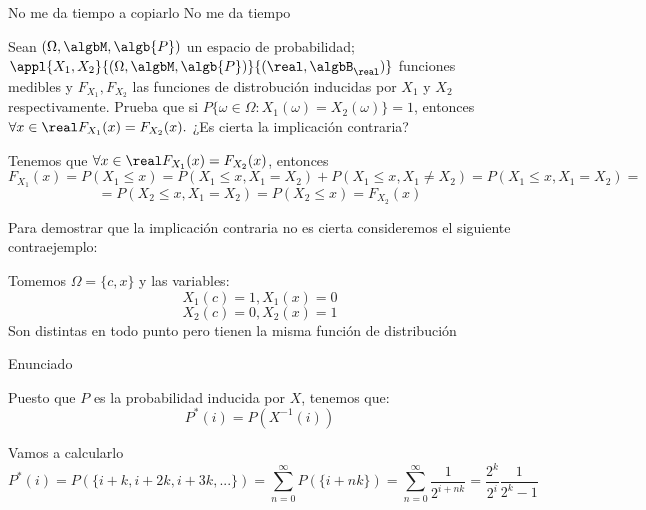 \begin{problem}[3]
No me da tiempo a copiarlo
\solution
No me da tiempo
\end{problem}

\begin{problem}[6]
Sean $(\Omega, \algbM, \algb{P})$ un espacio de probabilidad; $\appl{X_1, X_2}{(\Omega, \algbM, \algb{P})}{(\real, \algbB_{\real})}$ funciones medibles y $F_{X_1}, F_{X_2}$ las funciones de distrobución inducidas por $X_1$ y $X_2$ respectivamente. Prueba que si $P\{\omega \in \Omega : X_1(\omega)=X_2(\omega)\}=1$, entonces $\forall x \in \real F_{X_1}(x) = F_{X_2}(x).$ ¿Es cierta la implicación contraria?

\solution
Tenemos que $\forall x \in \real F_{X_1}(x) = F_{X_2}(x)$, entonces
\[F_{X_1}(x) = P(X_1 \leq x) = P(X_1 \leq x, X_1=X_2) + P(X_1 \leq x, X_1 \neq X_2) = P(X_1 \leq x, X_1=X_2) = \]
\[= P(X_2 \leq x, X_1=X_2)=P(X_2  \leq x)=F_{X_2}(x)\]

Para demostrar que la implicación contraria no es cierta consideremos el siguiente contraejemplo:

Tomemos $\Omega = \{c,x\}$ y las variables:
\[X_1(c)=1, X_1(x)=0\]
\[X_2(c)=0, X_2(x)=1\]
Son distintas en todo punto pero tienen la misma función de distribución
\end{problem}

\begin{problem}[7]
Enunciado

\solution
Puesto que $P$ es la probabilidad inducida por $X$, tenemos que:
\[P^*(i) = P(X^{-1}(i))\]

Vamos a calcularlo
\[P^*(i) = P(\{i+k, i+2k, i+3k, ...\}) = \sum_{n=0}^{\infty} P(\{i+nk\}) = \sum_{n=0}^{\infty} \frac{1}{2^{i+nk}} = \frac{2^k}{2^i}\frac{1}{2^k-1}\]

\end{problem}

